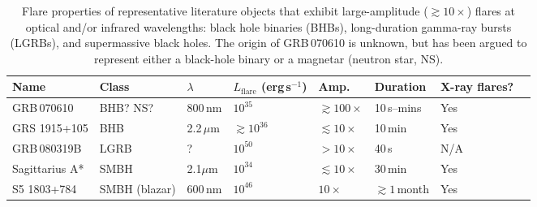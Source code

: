 \documentclass{nature_plusfigure}
\begin{document}
\begin{table}
    \centering
    \begin{tabular}{l|l|l|l|l|l|l|l}
    \hline\hline
     Name & Class & $\lambda$ & $L_\mathrm{flare}$ (erg\,s$^{-1}$) & Amp. & Duration & X-ray flares? \\
     \hline
    GRB\,070610 & BHB?\cite{Kasliwal2008} NS?\cite{CastroTirado2008,Stefanescu2008} & 800\,nm & $10^{35}$ & $\gtrsim100\times$ & 10\,s--mins & Yes \\
    GRS 1915+105 & BHB & 2.2\,$\mu$m\cite{Fender1997} & $\gtrsim10^{36}$ & $\lesssim 10\times$ & 10\,min & Yes \\
    GRB\,080319B & LGRB & ?\cite{Racusin2008} & $10^{50}$ & $>10\times$ & 40\,s & N/A \\
    Sagittarius A* & SMBH & 2.1$\mu$m\cite{Marrone2008} & $10^{34}$ & $\lesssim 10\times$ & 30\,min & Yes \\
    S5 1803+784 & SMBH (blazar) & 600\,nm\cite{Nesci2021} & $10^{46}$ & $10\times$ & $\gtrsim1\,$month & Yes \\
    \hline\hline
    \end{tabular}
    \caption{Flare properties of representative literature objects that exhibit large-amplitude ($\gtrsim10\times$) flares at optical and/or infrared wavelengths: black hole binaries (BHBs), long-duration gamma-ray bursts (LGRBs), and supermassive black holes. The origin of GRB\,070610 is unknown, but has been argued to represent either a black-hole binary or a magnetar (neutron star, NS).}
    \label{tab:flaring-classes}
\end{table}

\clearpage


%
%
\end{document}
